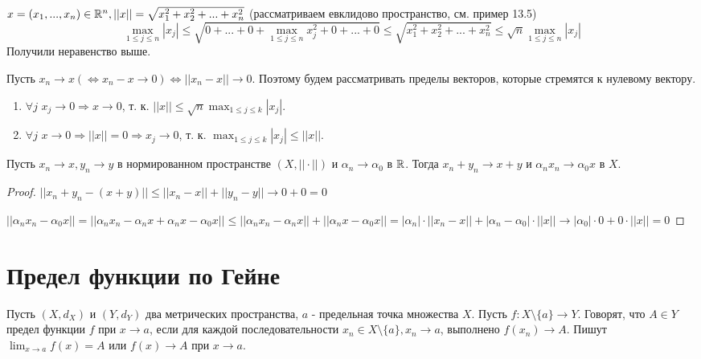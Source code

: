     \begin{explanation}
    	$x = (x_1, ..., x_n) \in \mathbb R^n, ||x|| = \sqrt{x_1^2 + x_2^2 + ... + x_n^2}$ (рассматриваем евклидово пространство, см. пример 13.5)
    	\[ \max_{1 \leqslant j \leqslant n} |x_j| \leqslant \sqrt{0 + ... + 0 + \max_{1 \leqslant j \leqslant n} x_j^2 + 0 + ... + 0} \leqslant \sqrt{x_1^2 + x_2^2 + ... + x_n^2} \leqslant \sqrt{n} \max_{1 \leqslant j \leqslant n} |x_j| \]
    	Получили неравенство выше.
    
    	Пусть $x_n \to x (\Leftrightarrow x_n - x \to 0) \Leftrightarrow ||x_n - x|| \to 0$. Поэтому будем рассматривать пределы векторов, которые стремятся к нулевому вектору.
    	\begin{enumerate}
    		\item $\forall j$ $x_j \to 0 \Rightarrow x \to 0$, т. к. $||x|| \leqslant \sqrt{n} \max_{1 \leqslant j \leqslant k} |x_j|$.
    		\item $\forall j$ $x \to 0 \Rightarrow ||x|| = 0 \Rightarrow x_j \to 0$, т. к. $\max_{1 \leqslant j \leqslant k} |x_j| \leqslant ||x||$.
    	\end{enumerate}
    \end{explanation}
    
    \begin{sentence}
    	Пусть $x_n \rightarrow x, y_n \rightarrow y$ в нормированном пространстве $(X, ||\cdot||)$ и $\alpha_n \rightarrow \alpha_0$ в $\mathbb R$. Тогда $x_n + y_n \rightarrow x + y$ и $\alpha_n x_n \rightarrow \alpha_0 x$ в $X$.
    \end{sentence}
    
    \begin{proof}
    	$||x_n + y_n - (x + y)|| \leqslant ||x_n - x|| + ||y_n - y|| \to 0 + 0 = 0$
    	
    	$||\alpha_n x_n - \alpha_0 x|| = ||\alpha_n x_n - \alpha_n x + \alpha_n x - \alpha_0 x|| \leqslant ||\alpha_n x_n - \alpha_n x|| + ||\alpha_n x - \alpha_0 x|| = |\alpha_n| \cdot ||x_n - x|| + |\alpha_n - \alpha_0| \cdot ||x|| \to |\alpha_0| \cdot 0 + 0 \cdot ||x|| = 0$
    \end{proof}
    
    
    \section{Предел функции по Гейне}
    
    \begin{definition}
    	Пусть $(X, d_X)$ и $(Y, d_Y)$ два метрических пространства, $a$ - предельная точка множества $X$. Пусть $f : X \setminus \{a\} \rightarrow Y$. Говорят, что $A \in Y$ предел функции $f$ при $x \rightarrow a$, если для каждой  последовательности $x_n \in X \setminus \{a\}, x_n \rightarrow a$, выполнено $f(x_n) \rightarrow A$. Пишут $\displaystyle \lim_{x \rightarrow a} f(x) = A$ или $f(x) \rightarrow A$ при $x \rightarrow a$.
    \end{definition}
    
